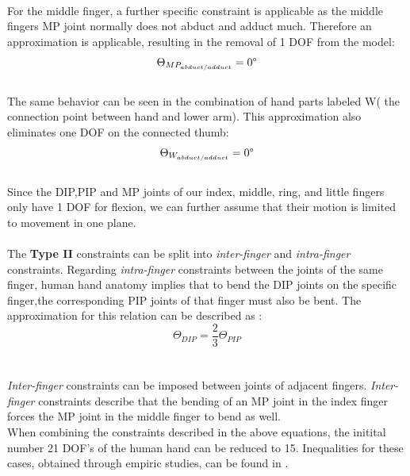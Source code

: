 \\For the middle finger, a further specific constraint is applicable as the middle fingers MP joint normally does not abduct and adduct much. Therefore an approximation is applicable, resulting in the removal of 1 DOF from the model:\\
\begin{equation}
\Theta _{MP_{abduct/adduct}}=0\degree
\end{equation}
\\The same behavior can be seen in the combination of hand parts labeled W( the connection point between hand and lower arm). This approximation also eliminates one DOF on the connected thumb:\\
\begin{equation}
\Theta _{W_{abduct/adduct}}=0\degree
\end{equation}
\\Since the DIP,PIP and MP joints of our index, middle, ring, and little fingers only have 1 DOF for flexion, we can further assume that their motion is limited to movement in one plane. \\\\
The \textbf{Type II} constraints can be split into \textit{inter-finger} and\textit{ intra-finger} constraints.
Regarding \textit{intra-finger} constraints between the joints of the same finger, human hand anatomy implies that to bend the DIP joints on the specific finger,the corresponding PIP joints of that finger must also be bent.
The approximation for this relation\cite{Rijpkema.1991} can be described as :\\
\begin{equation}
\Theta _{DIP} =\frac{2}{3}\Theta _{PIP}
\end{equation}\\
\\\textit{Inter-finger} constraints can be imposed between joints of adjacent fingers. \textit{Inter-finger} constraints describe that the bending of an MP joint in the index finger forces the MP joint in the middle finger to bend as well.\\
 When combining the constraints described in the above equations, the initital number 21 DOF's of the human hand can be reduced to 15. Inequalities for these cases, obtained through empiric studies, can be found in \citep{LEE.1995}.\\
